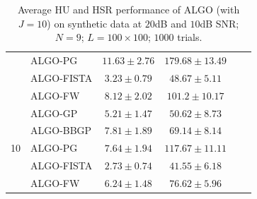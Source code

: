 \begin{table}[h]
\begin{adjustbox}{max width=\textwidth}
\begin{tabular}{|c|l|c|c|c|c|}
                    & ALGO-PG                    & $11.63    \pm 2.76$   & $179.68   \pm 13.49$ \tabularnewline
                    & ALGO-FISTA                 & $3.23     \pm 0.79$   & $48.67    \pm 5.11$  \tabularnewline
                    & ALGO-FW                    & $8.12     \pm 2.02$   & $101.2    \pm 10.17$ \tabularnewline \cline{1-4}
\multirow{5}{*}{10} & ALGO-GP                    & $5.21     \pm 1.47$   & $50.62    \pm 8.73$  \tabularnewline
                    & ALGO-BBGP                  & $7.81     \pm 1.89$   & $69.14    \pm 8.14$  \tabularnewline
                    & ALGO-PG                    & $7.64     \pm 1.94$   & $117.67   \pm 11.11$ \tabularnewline
                    & ALGO-FISTA                 & $2.73     \pm 0.74$   & $41.55    \pm 6.18$  \tabularnewline
                    & ALGO-FW                    & $6.24     \pm 1.48$   & $76.62    \pm 5.96$  \tabularnewline \cline{1-4}
\end{tabular}
\end{adjustbox}
\caption{Average HU and HSR performance of ALGO (with $J=10$) on synthetic
         data at $20$dB and $10$dB SNR; $N = 9$; $L = 100 \times 100$; $1000$
         trials.}
\label{table:results_full_MO9_SNR2010dB_J10}
\end{table}

\newpage

